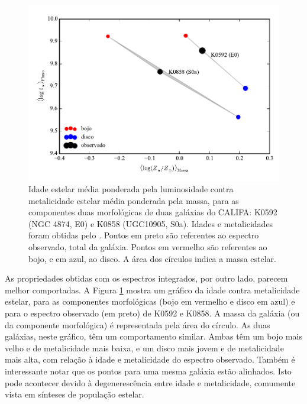 \begin{figure}
	\includegraphics{figuras/sample006a_synthesis_all2}
	\caption[Idade e metalicidade médios das componentes morfológicas]
	{Idade estelar média ponderada pela luminosidade contra metalicidade estelar
	média ponderada pela massa, para as componentes duas morfológicas de
	duas galáxias do CALIFA: K0592 (NGC 4874, E0) e K0858 (UGC10905, S0a). Idades
	e metalicidades foram obtidas pelo \starlight. Pontos em preto são referentes
	ao espectro observado, total da galáxia. Pontos em vermelho são referentes
	ao bojo, e em azul, ao disco. A área dos círculos indica a massa estelar.}
	\label{fig:decompSintese}
\end{figure}

As propriedades obtidas com os espectros integrados, por outro lado, parecem
melhor comportadas. A Figura \ref{fig:decompSintese} mostra um gráfico da idade
contra metalicidade estelar, para as componentes morfológicas (bojo em vermelho
e disco em azul) e para o espectro observado (em preto) de K0592 e K0858. A
massa da galáxia (ou da componente morfológica) é representada pela área do
círculo.
As duas galáxias, neste gráfico, têm um comportamento similar.
Ambas têm um bojo mais velho e de metalicidade mais baixa, e um disco mais jovem
e de metalicidade mais alta, com relação à idade e metalicidade do espectro
observado. Também é interessante notar que os pontos para uma mesma galáxia
estão alinhados. Isto pode acontecer devido à degenerescência entre idade e
metalicidade, comumente vista em sínteses de população estelar.

